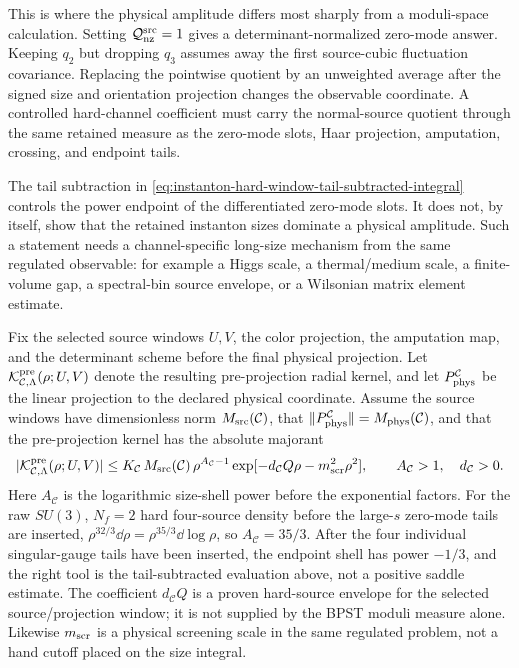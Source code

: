 \begin{controlledapproximation}
This is where the physical amplitude differs most sharply from a moduli-space
calculation.  Setting
\(\mathcal Q_{\rm nz}^{\rm src}=1\) gives a determinant-normalized zero-mode
answer.  Keeping \(q_2\) but dropping \(q_3\) assumes away the first
source-cubic fluctuation covariance.  Replacing the pointwise quotient by an
unweighted average after the signed size and orientation projection changes the
observable coordinate.  A controlled hard-channel coefficient must carry the
normal-source quotient through the same retained measure as the zero-mode slots,
Haar projection, amputation, crossing, and endpoint tails.
\end{controlledapproximation}

\begin{controlledapproximation}
\label{ca:instanton-hard-screened-retained-window}
The tail subtraction in
\eqref{eq:instanton-hard-window-tail-subtracted-integral} controls the power
endpoint of the differentiated zero-mode slots.  It does not, by itself, show
that the retained instanton sizes dominate a physical amplitude.  Such a
statement needs a channel-specific long-size mechanism from the same regulated
observable: for example a Higgs scale, a thermal/medium scale, a finite-volume
gap, a spectral-bin source envelope, or a Wilsonian matrix element estimate.

Fix the selected source windows \(U,V\), the color projection, the amputation
map, and the determinant scheme before the final physical projection.  Let
\(\mathcal K^{\rm pre}_{\mathcal C,\Lambda}(\rho;U,V)\) denote the resulting
pre-projection radial kernel, and let \(P_{\rm phys}^{\mathcal C}\) be the
linear projection to the declared physical coordinate.  Assume the source
windows have dimensionless norm \(M_{\rm src}(\mathcal C)\), that
\(\|P_{\rm phys}^{\mathcal C}\|=M_{\rm phys}(\mathcal C)\), and that the
pre-projection kernel has the absolute majorant
\begin{equation}
  |\mathcal K^{\rm pre}_{\mathcal C,\Lambda}(\rho;U,V)|
  \le
  K_{\mathcal C}\,
  M_{\rm src}(\mathcal C)\,
  \rho^{A_{\mathcal C}-1}
  \exp[-d_{\mathcal C}Q\rho-m_{\rm scr}^2\rho^2],
  \qquad
  A_{\mathcal C}>1,\quad d_{\mathcal C}>0 .
  \label{eq:instanton-hard-screened-channel-majorant}
\end{equation}
Here \(A_{\mathcal C}\) is the logarithmic size-shell power before the
exponential factors.  For the raw \(SU(3)\), \(N_f=2\) hard four-source density
before the large-\(s\) zero-mode tails are inserted,
\(\rho^{32/3}\dd\rho=\rho^{35/3}\dd\log\rho\), so
\(A_{\mathcal C}=35/3\).  After the four individual singular-gauge tails have
been inserted, the endpoint shell has power \(-1/3\), and the right tool is the
tail-subtracted evaluation above, not a positive saddle estimate.  The
coefficient \(d_{\mathcal C}Q\) is a proven hard-source envelope for the
selected source/projection window; it is not supplied by the BPST moduli
measure alone.  Likewise \(m_{\rm scr}\) is a physical screening scale in the
same regulated problem, not a hand cutoff placed on the size integral.


\end{controlledapproximation}

